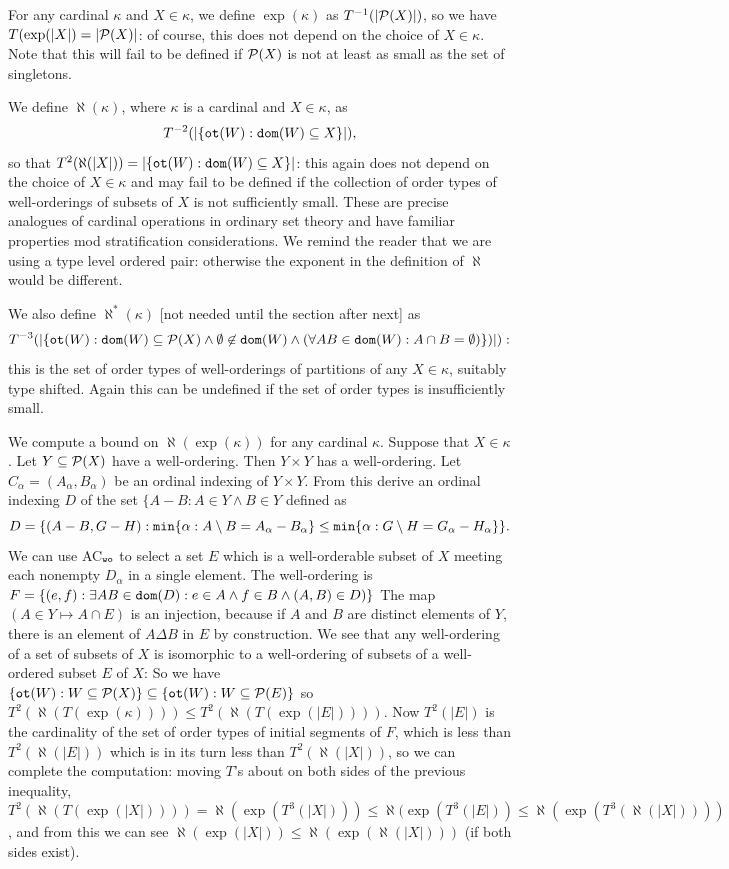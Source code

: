 \documentclass[12pt]{article}
\begin{document}
For any cardinal $\kappa$ and $X \in \kappa$, we define $\exp(\kappa)$ as $T^{-1}(|{\cal P}(X)|)$, so we have $T(\exp(|X|) = |{\cal P}(X)|$:  of course, this does not depend on the choice of $X \in \kappa$.  Note that this will  fail to be defined if ${\cal P}(X)$ is not at least as small as the set of singletons.   

We define $\aleph(\kappa)$, where $\kappa$ is a cardinal and $X \in \kappa$,  as $$T^{-2}(|\{{\tt ot}(W):{\tt dom}(W) \subseteq X\}|),$$ so that $T^2(\aleph(|X|)) = |\{{\tt ot}(W):{\tt dom}(W) \subseteq X\}|$:  this again does not depend on the choice of $X \in \kappa$ and may fail to be defined if the collection of order types of well-orderings of subsets of $X$  is not sufficiently small.  These are precise analogues of cardinal operations in ordinary set theory and have familiar properties mod stratification considerations.  We remind the reader that we are using a type level ordered pair:  otherwise the exponent in the definition of $\aleph$ would be different.

We also define $\aleph^*(\kappa)$ [not needed until the section after next] as $$T^{-3}(|\{{\tt ot}(W):{\tt dom}(W)\subseteq {\cal P}(X) \wedge \emptyset \not\in {\tt dom}(W) \wedge (\forall AB \in {\tt dom}(W):A \cap B = \emptyset)\})|):$$  this is the set of order types of well-orderings of partitions of any $X \in \kappa$, suitably type shifted.  Again this can be undefined if the set of order types is insufficiently small.

We compute a bound on $\aleph(\exp(\kappa))$ for any cardinal $\kappa$.   Suppose that $X \in \kappa$.
Let $Y \subseteq {\cal P}(X)$ have a well-ordering.   Then $Y \times Y$ has a well-ordering.  Let $C_\alpha = (A_\alpha,B_\alpha)$ be an ordinal indexing of $Y\times Y$.  From this derive an ordinal indexing $D$ of the set
$\{A-B:A \in Y \wedge B\in Y$ defined as $$D=\{(A-B,G-H):{\tt min}\{\alpha:A\setminus B = A_\alpha-B_\alpha\} \leq {\tt min}\{\alpha:G\setminus H=G_\alpha-H_\alpha\}\}.$$  We can use AC$_{\tt wo}$ to select a set $E$ which is a well-orderable subset of $X$ meeting each nonempty $D_\alpha$ in a single element.  The well-ordering is $F=\{(e,f):\exists AB \in {\tt dom}(D):e \in A \wedge f \in B \wedge (A,B) \in D)\}$ The map $(A \in Y \mapsto A \cap E)$ is an injection, because if $A$ and $B$ are distinct elements of $Y$, there is an element of $A \Delta B$ in $E$ by construction.  We see that any well-ordering of a set of subsets of $X$ is isomorphic to a well-ordering of subsets of a well-ordered subset $E$ of $X$:
So we have $\{{\tt ot}(W):W \subseteq {\cal P}(X)\} \subseteq \{{\tt ot}(W):W \subseteq {\cal P}(E)\}$ 
so $T^2(\aleph(T(\exp(\kappa)))) \leq T^2(\aleph(T(\exp(|E|))))$.  Now $T^2(|E|)$ is the cardinality of the set
of order types of initial segments of $F$, which is less than $T^2(\aleph(|E|))$ which is in its turn less than $T^2(\aleph(|X|))$, so we can complete the computation:  moving $T$'s about on both sides of the previous inequality, $T^2(\aleph(T(\exp(|X|)))) = \aleph(\exp(T^3(|X|))) \leq \aleph(\exp(T^3(|E|)) \leq \aleph(\exp(T^3(\aleph(|X|))))$, and from this we can see $\aleph(\exp(|X|)) \leq \aleph(\exp(\aleph(|X|)))$ (if both sides exist).
\end{document}
